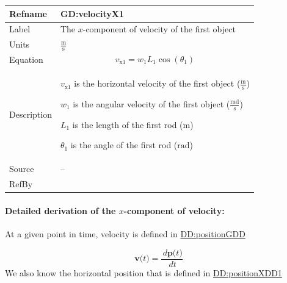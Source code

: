 \documentclass[12pt]{article}
\begin{document}
\vspace{\baselineskip}
\noindent
\begin{minipage}{\textwidth}
\begin{tabular}{>{\raggedright}p{}>{\raggedright\arraybackslash}p{}}
\toprule \textbf{Refname} & \textbf{GD:velocityX1}
\label{GD:velocityX1}
\\ \midrule
Label & The $x$-component of velocity of the first object
        
\\ \midrule
Units & $\frac{\text{m}}{\text{s}}$
        
\\ \midrule
Equation & \begin{displaymath}
           {v_{\text{x}1}}={w_{1}} {L_{1}} \cos\left({θ_{1}}\right)
           \end{displaymath}
\\ \midrule
Description & \begin{symbDescription}
              \item{${v_{\text{x}1}}$ is the horizontal velocity of the first object ($\frac{\text{m}}{\text{s}}$)}
              \item{${w_{1}}$ is the angular velocity of the first object ($\frac{\text{rad}}{\text{s}}$)}
              \item{${L_{1}}$ is the length of the first rod (${\text{m}}$)}
              \item{${θ_{1}}$ is the angle of the first rod (${\text{rad}}$)}
              \end{symbDescription}
\\ \midrule
Source & --
         
\\ \midrule
RefBy & 
\\ \bottomrule
\end{tabular}
\end{minipage}

\paragraph{Detailed derivation of the $x$-component of velocity:}
\label{GD:velocityX1Deriv}
At a given point in time, velocity is defined in \hyperref[DD:positionGDD]{DD:positionGDD}

\begin{displaymath}
\symbf{v}\text{(}t\text{)}=\frac{\,d\symbf{p}\text{(}t\text{)}}{\,dt}
\end{displaymath}
We also know the horizontal position that is defined in \hyperref[DD:positionXDD1]{DD:positionXDD1}
\end{document}
